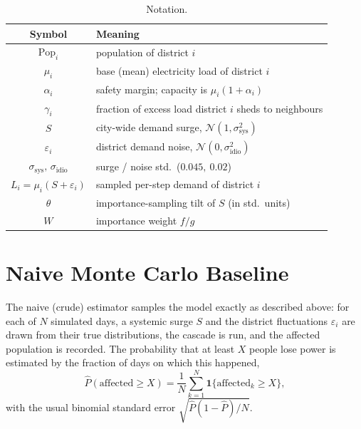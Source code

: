 \documentclass[11pt,a4paper]{article}
\begin{document}
\begin{table}[H]
    \centering
    \caption{Notation.}
    \label{tab:notation}
    \begin{tabular}{cl}
        \toprule
        Symbol & Meaning \\
        \midrule
        $\text{Pop}_i$            & population of district $i$ \\
        $\mu_i$                   & base (mean) electricity load of district $i$ \\
        $\alpha_i$                & safety margin; capacity is $\mu_i(1+\alpha_i)$ \\
        $\gamma_i$                & fraction of excess load district $i$ sheds to neighbours \\
        $S$                       & city-wide demand surge, $\mathcal{N}(1,\sigma_{\text{sys}}^2)$ \\
        $\varepsilon_i$           & district demand noise, $\mathcal{N}(0,\sigma_{\text{idio}}^2)$ \\
        $\sigma_{\text{sys}},\,\sigma_{\text{idio}}$ & surge / noise std.\ ($0.045,\ 0.02$) \\
        $L_i = \mu_i(S+\varepsilon_i)$ & sampled per-step demand of district $i$ \\
        $\theta$                  & importance-sampling tilt of $S$ (in std.\ units) \\
        $W$                       & importance weight $f/g$ \\
        \bottomrule
    \end{tabular}
\end{table}

\section{Naive Monte Carlo Baseline}

The naive (crude) estimator samples the model exactly as described above:
for each of $N$ simulated days, a systemic surge $S$ and the district
fluctuations $\varepsilon_i$ are drawn from their true distributions, the cascade
is run, and the affected population is recorded. The probability that at least
$X$ people lose power is estimated by the fraction of days on which this
happened,
\begin{equation}
    \hat{P}(\text{affected} \ge X) = \frac{1}{N}\sum_{k=1}^{N} \mathbf{1}\{\text{affected}_k \ge X\},
\end{equation}
with the usual binomial standard error $\sqrt{\hat{P}(1-\hat{P})/N}$.
\end{document}
